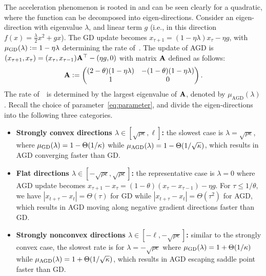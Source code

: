 The acceleration phenomenon is rooted in and can be seen clearly for a quadratic, where the function can be decomposed into eigen-directions. Consider an eigen-direction with eigenvalue $\lambda$, and linear term $g$ (i.e., in this direction $f(x) =  \frac{\lambda}{2} x^2 + gx$).
The GD update becomes $x_{\tau+1} = (1-\eta\lambda)x_{\tau} - \eta g$, with $\mu_{\text{GD}}(\lambda) \mathrel{\mathop:}= 1-\eta\lambda$ determining the rate of~\gd. The update of AGD is $(x_{\tau+1}, x_\tau) = (x_{\tau}, x_{\tau-1})\mathbf{A}^{\top} - (\eta g, 0)$ with matrix $\mathbf{A}$ defined as follows:
\begin{equation*}
\mathbf{A} \mathrel{\mathop:}= \begin{pmatrix} (2-\theta) (1 - \eta\lambda)&  -(1-\theta) (1 - \eta\lambda) \\ 1 & 0 \end{pmatrix}.
\end{equation*}
The rate of~\nag~is determined by the largest eigenvalue of $\mathbf{A}$, denoted by $\mu_{\text{AGD}}(\lambda)$. Recall the choice of parameter~\eqref{eq:parameter}, and divide the eigen-directions into the following three categories.
\begin{itemize}
\item \textbf{Strongly convex directions $\lambda \in [\sqrt{\rho\epsilon}, \ell]$:} the slowest case is $\lambda = \sqrt{\rho\epsilon}$, where
$\mu_{\text{GD}}(\lambda) = 1- \Theta(1/\kappa)$ while $\mu_{\text{AGD}}(\lambda) = 1-\Theta(1/\sqrt{\kappa})$, which results in AGD converging faster than GD.
\item \textbf{Flat directions $\lambda \in [-\sqrt{\rho\epsilon}, \sqrt{\rho\epsilon}]$:}  the representative case is $\lambda = 0$ where AGD update becomes $x_{\tau+1} - x_\tau = (1-\theta) (x_\tau - x_{\tau - 1}) - \eta g$. For $\tau \le 1/\theta$, we have $|x_{t+\tau} - x_t| =  \Theta(\tau)$ for GD while  $|x_{t+\tau} - x_t| =  \Theta(\tau^2)$ for AGD, which results in AGD moving along negative gradient directions faster than GD.
\item \textbf{Strongly nonconvex directions $\lambda \in [-\ell, -\sqrt{\rho\epsilon}]$:} similar to the strongly convex case, the slowest rate is for $\lambda = -\sqrt{\rho\epsilon}$ where
$\mu_{\text{GD}}(\lambda) = 1 + \Theta(1/\kappa)$ while $\mu_{\text{AGD}}(\lambda) = 1 + \Theta(1/\sqrt{\kappa})$, which results in AGD escaping saddle point faster than GD.
\end{itemize}


